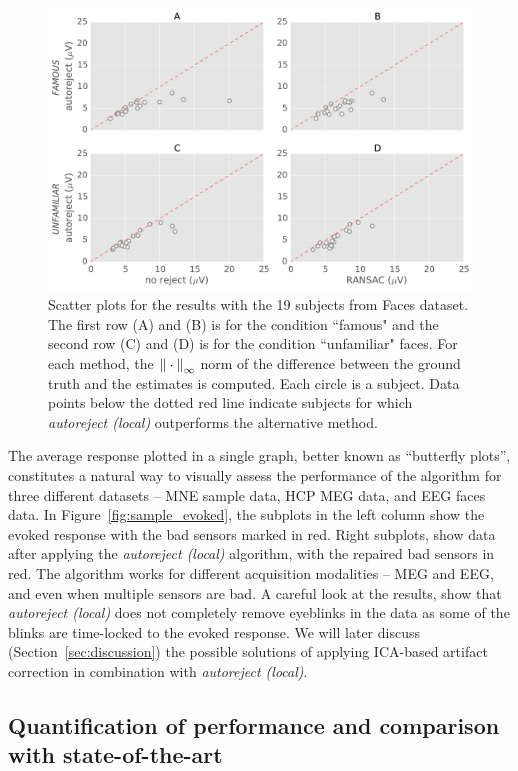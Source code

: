 \begin{figure}[htb!]
    \centering
    \includegraphics[width=0.75\linewidth]{figures/figure7.pdf}
    \caption{Scatter plots for the results with the 19 subjects from Faces dataset. The first row (A) and (B) is for the condition ``famous" and the second row (C) and (D) is for the condition ``unfamiliar" faces. For each method, the ${\| \cdot \|}_{\mathrm{\infty}}$ norm of the difference between the ground truth and the estimates is computed. Each circle is a subject. Data points below the dotted red line indicate subjects for which \textit{autoreject (local)} outperforms the alternative method.}
    \label{fig:dgw_scatter}
\end{figure}

The average response plotted in a single graph, better known as ``butterfly plots'', constitutes a natural way to visually assess the performance of the algorithm for three different datasets -- MNE sample data, HCP MEG data, and EEG faces data. In Figure~\ref{fig:sample_evoked}, the subplots in the left column show the evoked response with the bad sensors marked in red. Right subplots, show data after applying the \emph{autoreject (local)} algorithm, with the repaired bad sensors in red. The algorithm works for different acquisition modalities -- MEG and EEG, and even when multiple sensors are bad. A careful look at the results, show that \emph{autoreject (local)} does not completely remove eyeblinks in the data as some of the blinks are time-locked to the evoked response. We will later discuss (Section~\ref{sec:discussion}) the possible solutions of applying ICA-based artifact correction in combination with \emph{autoreject (local)}.

\subsection{Quantification of performance and comparison with state-of-the-art}
\label{sec:benchmark_sensors}

